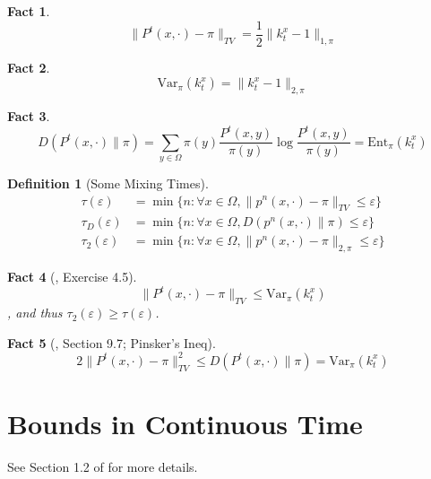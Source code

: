 \documentclass{article}
\newtheorem{fact}{Fact}[section]
\newtheorem{define}{Definition}[section]
\begin{document}
\begin{fact}
  \[\parallel P^t(x, \cdot) - \pi \parallel_{TV} = \frac{1}{2}\parallel k^x_t - 1 \parallel_{1,\pi}\]
\end{fact}

\begin{fact}
  \[\mathrm{Var}_\pi(k^x_t) = \parallel k^x_t - 1 \parallel_{2, \pi}\]
\end{fact}

\begin{fact}
  \[D(P^t(x, \cdot) \parallel \pi) =\sum_{y\in \Omega}\pi(y)\frac{P^t(x, y)}{\pi(y)}\log \frac{P^t(x,y)}{\pi(y)} = \mathrm{Ent}_\pi (k^x_t)\]
\end{fact}

\begin{define}[Some Mixing Times]
  \begin{align*}
    \tau(\varepsilon) &= \min\{n: \forall x\in \Omega, \parallel p^n(x,\cdot) - \pi \parallel_{TV} \leq \varepsilon\} \\
    \tau_D(\varepsilon) &= \min\{n: \forall x\in \Omega, D(p^n(x,\cdot) \parallel \pi) \leq \varepsilon\} \\
    \tau_2(\varepsilon) &= \min\{n: \forall x\in \Omega, \parallel p^n(x,\cdot) - \pi \parallel_{2, \pi} \leq \varepsilon\} 
  \end{align*}
\end{define}

\begin{fact}[\cite{levin2017markov}, Exercise 4.5]
  \[\parallel P^t(x, \cdot) - \pi \parallel_{TV} \leq \mathrm{Var}_\pi(k^x_t)\],
  and thus $\tau_2(\varepsilon) \geq \tau(\varepsilon)$.
\end{fact}

\begin{fact}[\cite{jerrum2005integrating}, Section 9.7; Pinsker's Ineq]
  \[2\parallel P^t(x,\cdot) - \pi \parallel^2_{TV} \leq D(P^t(x, \cdot) \parallel \pi) = \mathrm{Var}_\pi(k^x_t)\]
\end{fact}

\section{Bounds in Continuous Time}
See Section 1.2 of \cite{montenegro2006mathematical} for more details.

\clearpage


\end{document}
